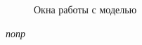 \documentclass[a4paper,12pt]{extarticle}
\begin{document}
\begin{figure}[h]
\begin{minipage}[h]{0.3\linewidth}
    \end{minipage}
    \caption{Окна работы с моделью}
    \label{ris:load_model}
\end{figure}



\renewcommand\refname{Литература}


\textit{попр}
\end{document}
